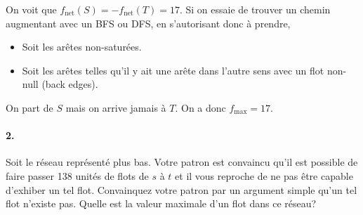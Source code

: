 \begin{solution}
  On voit que $f_\mathrm{net}(S) = -f_\mathrm{net}(T) = 17$.
  Si on essaie de trouver un chemin augmentant avec un BFS ou DFS,
  en s'autorisant donc à prendre,
  \begin{itemize}
    \item Soit les arêtes non-saturées.
    \item Soit les arêtes telles qu'il y ait une arête dans l'autre
      sens avec un flot non-null (back edges).
  \end{itemize}
  On part de $S$ mais on arrive jamais à $T$.
  On a donc $f_\mathrm{max} = 17$.
  \begin{center}
  \end{center}
\end{solution}


\paragraph{2. } Soit le réseau représenté plus bas. Votre patron est convaincu qu'il est possible de faire passer 138 unités de flots de $s$ à $t$ et il vous reproche de ne pas être capable d'exhiber un tel flot. Convainquez votre patron par un argument simple qu'un tel flot n'existe pas. Quelle est la valeur maximale d'un flot dans ce réseau? 


